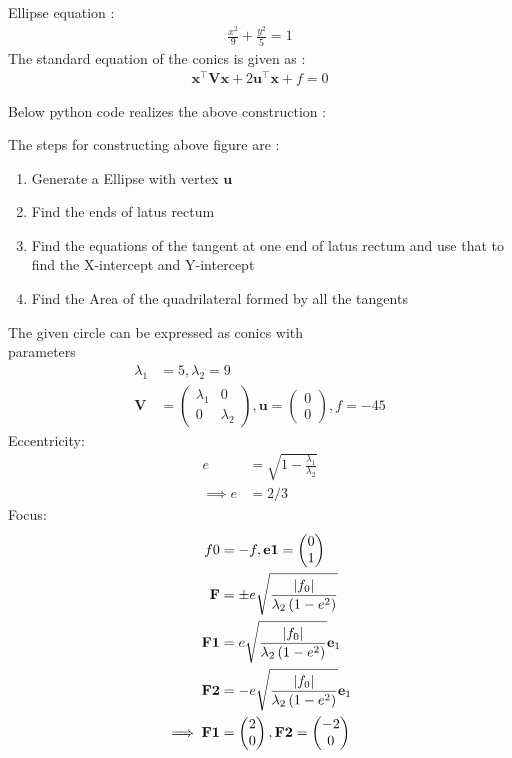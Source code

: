 \documentclass[10pt, a4paper]{article}
\providecommand{\brak}[1]{\ensuremath{\left(#1\right)}}
\newcommand{\myvec}[1]{\ensuremath{\begin{pmatrix}#1\end{pmatrix}}}
\let\vec\mathbf
\begin{document}
Ellipse equation : \begin{align}
\frac{x^2}{9}+\frac{y^2}{5}=1
  \end{align}
The standard equation of the conics is given as :
\begin{align}
\vec{x}^{\top}\vec{V}\vec{x}+2\vec{u}^{\top}\vec{x}+f=0
\end{align}
\begin{center}
Below python code realizes the above construction :
\end{center}
 The steps for constructing above figure are :
\begin{enumerate}
 \item Generate a Ellipse with vertex $\vec{u}$
 \item Find the ends of latus rectum  
 \item Find the equations of the tangent at one end of latus rectum and use that to find the X-intercept and Y-intercept
  \item Find the Area of the quadrilateral formed by all the tangents
\end{enumerate}
The given circle  can be expressed as conics with \\parameters
\begin{align}
	\lambda_1&=5,\lambda_2=9 \\ \vec{V} &= \myvec{	\lambda_1& 0 \\
			          0 & \lambda_2}  
		    , \vec{u} = \myvec{0 \\0}, f = -45
	\end{align}
	Eccentricity:
	\begin{align}
	 e&=\sqrt{1-\frac{\lambda_1}{\lambda_2}}\\
	 \implies e&=2/3
	 \end{align}
	 Focus:
	 \begin{align}
	 f0&=-f,\vec{e1} = \myvec{0 \\1}\\
	 \vec{F}&= \pm e\sqrt{\frac{\abs{f_0}}{\lambda_2\brak{1-e^2}}}\\
	 	 \vec{F1}&=  e\sqrt{\frac{\abs{f_0}}{\lambda_2\brak{1-e^2}}}\vec{e}_1\\
	 	 \vec{F2}&= - e\sqrt{\frac{\abs{f_0}}{\lambda_2\brak{1-e^2}}}\vec{e}_1\\
	 \implies \vec{F1}&=\myvec{2\\0},\vec{F2}=\myvec{-2\\0}
	 \end{align}
\end{document}
